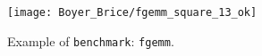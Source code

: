 \begin{figure}[htbp]
	\centering
	\small
	\texttt{[image: Boyer\_Brice/fgemm\_square\_13\_ok]}
	\caption{Example of \texttt{benchmark}: \texttt{fgemm}.\label{fig:bench}}
\end{figure}

